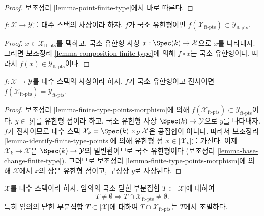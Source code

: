 \begin{proof}
보조정리 \ref{lemma-point-finite-type}에서 바로 따른다.
\end{proof}

\begin{lemma}
\label{lemma-finite-type-points-morphism}
$f : \mathcal{X} \to \mathcal{Y}$를 대수 스택의 사상이라 하자.
$f$가 국소 유한형이면
$f(\mathcal{X}_{\text{ft-pts}}) \subset \mathcal{Y}_{\text{ft-pts}}$.
\end{lemma}

\begin{proof}
$x \in \mathcal{X}_{\text{ft-pts}}$를 택하고, 국소 유한형 사상
$x : \Spec(k) \to \mathcal{X}$으로 $x$를 나타내자.
그러면 보조정리 \ref{lemma-composition-finite-type}에 의해
$f \circ x$는 국소 유한형이다. 따라서
$f(x) \in \mathcal{Y}_{\text{ft-pts}}$이다.
\end{proof}

\begin{lemma}
\label{lemma-finite-type-points-surjective-morphism}
$f : \mathcal{X} \to \mathcal{Y}$를 대수 스택의 사상이라 하자.
$f$가 국소 유한형이고 전사이면
$f(\mathcal{X}_{\text{ft-pts}}) = \mathcal{Y}_{\text{ft-pts}}$.
\end{lemma}

\begin{proof}
보조정리 \ref{lemma-finite-type-points-morphism}에 의해
$f(\mathcal{X}_{\text{ft-pts}}) \subset \mathcal{Y}_{\text{ft-pts}}$이다.
$y \in |\mathcal{Y}|$를 유한형 점이라 하고, 국소 유한형 사상
$\Spec(k) \to \mathcal{Y}$으로 $y$를 나타내자.
$f$가 전사이므로 대수 스택
$\mathcal{X}_k = \Spec(k) \times_\mathcal{Y} \mathcal{X}$은 공집합이 아니다.
따라서 보조정리 \ref{lemma-identify-finite-type-points}에 의해
유한형 점 $x \in |\mathcal{X}_k|$를 가진다.
이제 $\mathcal{X}_k \to \mathcal{X}$은
$\Spec(k) \to \mathcal{Y}$의 밑변환이므로 국소 유한형이다
(보조정리 \ref{lemma-base-change-finite-type}).
그러므로 보조정리 \ref{lemma-finite-type-points-morphism}에 의해
$\mathcal{X}$에서 $x$의 상은 유한형 점이고, 구성상 $y$로 사상된다.
\end{proof}

\begin{lemma}
\label{lemma-enough-finite-type-points}
$\mathcal{X}$를 대수 스택이라 하자.
임의의 국소 닫힌 부분집합 $T \subset |\mathcal{X}|$에 대하여
$$
T \not = \emptyset
\Rightarrow
T \cap \mathcal{X}_{\text{ft-pts}} \not = \emptyset.
$$
특히 임의의 닫힌 부분집합 $T \subset |\mathcal{X}|$에 대하여
$T \cap \mathcal{X}_{\text{ft-pts}}$는 $T$에서 조밀하다.
\end{lemma}

